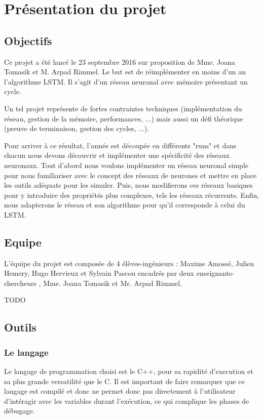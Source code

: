 
\chapter{Présentation du projet}

\section{Objectifs}

Ce projet a été lancé le 23 septembre 2016 sur proposition de Mme. Joana Tomasik
 et M. Arpad Rimmel. Le but est de réimplémenter en moins d'un an l'algorithme
LSTM\footnotemark. Il s'agit d'un réseau neuronal avec mémoire présentant
un cycle.

\bigskip

Un tel projet représente de fortes contraintes techniques (implémentation du
réseau, gestion de la mémoire, performances, ...) mais aussi un défi théorique
(preuve de terminaison, gestion des cycles, ...).

\bigskip

Pour arriver à ce résultat, l'année est découpée en différents "runs" et dans
chacun nous devons découvrir et implémenter une spécificité des réseaux
neuronaux.
Tout d'abord nous voulons implémenter un réseau neuronal simple pour
nous familiariser avec le concept des réseaux de neurones et mettre en place
les outils adéquats pour les simuler. Puis, nous modifierons ces réseaux
basiques pour y introduire des propriétés plus complexes, tels les réseaux
récurrents. Enfin, nous adapterons le réseau et son algorithme pour qu'il
corresponde à celui du LSTM.

\section{Equipe}

L'équipe du projet est composée de 4 élèves-ingénieurs : Maxime Amossé, Julien
Hemery, Hugo Hervieux et Sylvain Pascou encadrés par deux enseignants-chercheurs
, Mme. Joana Tomasik et Mr. Arpad Rimmel.

TODO

\section{Outils}

\subsection{Le langage}
Le langage de programmation choisi est le C++, pour sa rapidité d'execution et
sa plus grande versatilité que le C. Il est important de faire remarquer que
ce langage est compilé et donc ne permet donc pas directement à l'utilisateur
d'intéragir avec les variables durant l'exécution, ce qui complique les phases
de débugage.

